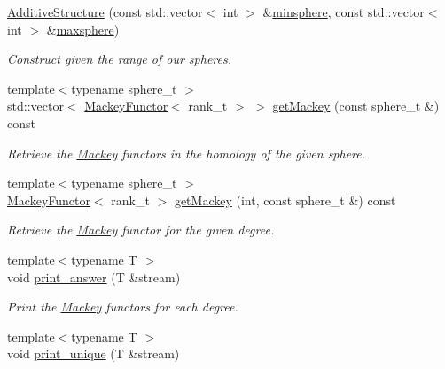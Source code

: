 \begin{DoxyCompactItemize}
\item 
\hyperlink{classMackey_1_1AdditiveStructure_a6e6b98b9df433129320045abd5e50bab}{Additive\+Structure} (const std\+::vector$<$ int $>$ \&\hyperlink{classMackey_1_1AdditiveStructure_a1158af906d8bb5b9dcc7eed72367f25e}{minsphere}, const std\+::vector$<$ int $>$ \&\hyperlink{classMackey_1_1AdditiveStructure_a1d26ee2b19d9d66744ee4d79c302d9c4}{maxsphere})
\begin{DoxyCompactList}\small\item\em Construct given the range of our spheres. \end{DoxyCompactList}\item 
{\footnotesize template$<$typename sphere\+\_\+t $>$ }\\std\+::vector$<$ \hyperlink{classMackey_1_1MackeyFunctor}{Mackey\+Functor}$<$ rank\+\_\+t $>$ $>$ \hyperlink{classMackey_1_1AdditiveStructure_ad18c28b9da58ec8b1c1579ace5953177}{get\+Mackey} (const sphere\+\_\+t \&) const
\begin{DoxyCompactList}\small\item\em Retrieve the \hyperlink{namespaceMackey}{Mackey} functors in the homology of the given sphere. \end{DoxyCompactList}\item 
{\footnotesize template$<$typename sphere\+\_\+t $>$ }\\\hyperlink{classMackey_1_1MackeyFunctor}{Mackey\+Functor}$<$ rank\+\_\+t $>$ \hyperlink{classMackey_1_1AdditiveStructure_a2638212adc9b1fdacf0a50d9fb23cf0d}{get\+Mackey} (int, const sphere\+\_\+t \&) const
\begin{DoxyCompactList}\small\item\em Retrieve the \hyperlink{namespaceMackey}{Mackey} functor for the given degree. \end{DoxyCompactList}\item 
{\footnotesize template$<$typename T $>$ }\\void \hyperlink{classMackey_1_1AdditiveStructure_a2ab350a9e5187964b9cf42c3f36805fa}{print\+\_\+answer} (T \&stream)
\begin{DoxyCompactList}\small\item\em Print the \hyperlink{namespaceMackey}{Mackey} functors for each degree. \end{DoxyCompactList}\item 
{\footnotesize template$<$typename T $>$ }\\void \hyperlink{classMackey_1_1AdditiveStructure_a82ea44d284efe410fb5d43c6a41dd3ed}{print\+\_\+unique} (T \&stream)

\end{DoxyCompactItemize}
